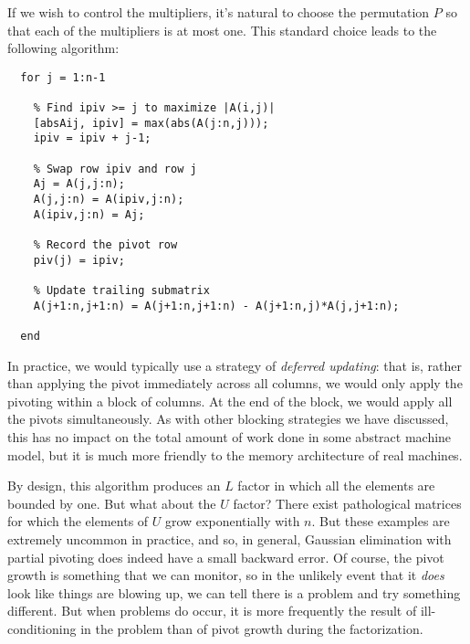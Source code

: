 If we wish to control the multipliers, it's natural to choose
the permutation $P$ so that each of the multipliers is at most one.
This standard choice leads to the following algorithm:
\begin{lstlisting}
  for j = 1:n-1

    % Find ipiv >= j to maximize |A(i,j)|
    [absAij, ipiv] = max(abs(A(j:n,j)));
    ipiv = ipiv + j-1;

    % Swap row ipiv and row j
    Aj = A(j,j:n);
    A(j,j:n) = A(ipiv,j:n);
    A(ipiv,j:n) = Aj;

    % Record the pivot row
    piv(j) = ipiv;

    % Update trailing submatrix
    A(j+1:n,j+1:n) = A(j+1:n,j+1:n) - A(j+1:n,j)*A(j,j+1:n);

  end
\end{lstlisting}
In practice, we would typically use a strategy of
{\em deferred updating}: that is, rather than applying the
pivot immediately across all columns, we would only apply
the pivoting within a block of columns.  At the end of the
block, we would apply all the pivots simultaneously.  As with
other blocking strategies we have discussed, this has no impact
on the total amount of work done in some abstract machine model,
but it is much more friendly to the memory architecture of real
machines.

By design, this algorithm produces an $L$ factor in which all the
elements are bounded by one.  But what about the $U$ factor?  There
exist pathological matrices for which the elements of $U$ grow
exponentially with $n$.  But these examples are extremely uncommon in
practice, and so, in general, Gaussian elimination with partial
pivoting does indeed have a small backward error.  Of course, the
pivot growth is something that we can monitor, so in the unlikely event
that it {\em does} look like things are blowing up, we can tell there
is a problem and try something different.
But when problems do occur, it is more frequently the result of
ill-conditioning in the problem than of pivot growth during the
factorization.
